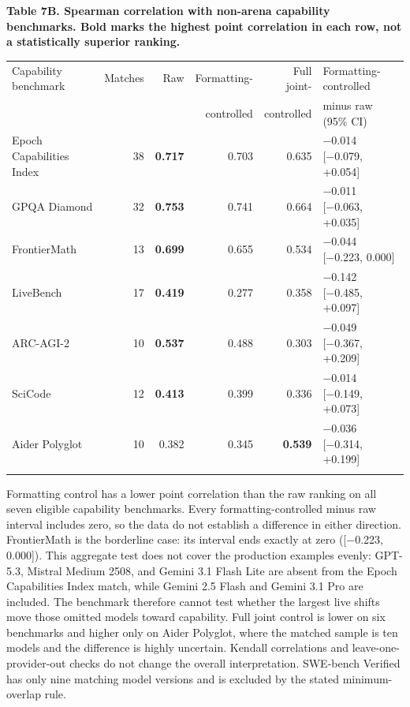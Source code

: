 \documentclass[
]{article}
\begin{document}
\begin{table}[htbp]
\textbf{Table 7B. Spearman correlation with non-arena capability
benchmarks. Bold marks the highest point correlation in each row, not a
statistically superior ranking.}

\medskip
\centering
\small
\setlength{\tabcolsep}{4pt}
\begin{tabular}{@{}lrrrrl@{}}
\toprule\noalign{}
Capability benchmark & Matches & Raw & Formatting- & Full joint- & Formatting-controlled \\
 & & & controlled & controlled & minus raw (95\% CI) \\
\midrule\noalign{}
Epoch Capabilities Index & 38 & \textbf{0.717} & 0.703 & 0.635 & −0.014
{[}−0.079, +0.054{]} \\
GPQA Diamond & 32 & \textbf{0.753} & 0.741 & 0.664 & −0.011 {[}−0.063,
+0.035{]} \\
FrontierMath & 13 & \textbf{0.699} & 0.655 & 0.534 & −0.044 {[}−0.223,
0.000{]} \\
LiveBench & 17 & \textbf{0.419} & 0.277 & 0.358 & −0.142 {[}−0.485,
+0.097{]} \\
ARC-AGI-2 & 10 & \textbf{0.537} & 0.488 & 0.303 & −0.049 {[}−0.367,
+0.209{]} \\
SciCode & 12 & \textbf{0.413} & 0.399 & 0.336 & −0.014 {[}−0.149,
+0.073{]} \\
Aider Polyglot & 10 & 0.382 & 0.345 & \textbf{0.539} & −0.036 {[}−0.314,
+0.199{]} \\
\bottomrule\noalign{}
\end{tabular}
\end{table}

Formatting control has a lower point correlation than the raw ranking on
all seven eligible capability benchmarks. Every formatting-controlled
minus raw interval includes zero, so the data do not establish a
difference in either direction. FrontierMath is the borderline case: its
interval ends exactly at zero ({[}−0.223, 0.000{]}). This aggregate test
does not cover the production examples evenly: GPT-5.3, Mistral Medium
2508, and Gemini 3.1 Flash Lite are absent from the Epoch Capabilities
Index match, while Gemini 2.5 Flash and Gemini 3.1 Pro are included. The
benchmark therefore cannot test whether the largest live shifts move
those omitted models toward capability. Full joint control is lower on
six benchmarks and higher only on Aider Polyglot, where the matched
sample is ten models and the difference is highly uncertain. Kendall
correlations and leave-one-provider-out checks do not change the overall
interpretation. SWE-bench Verified has only nine matching model versions
and is excluded by the stated minimum-overlap rule.
\end{document}
